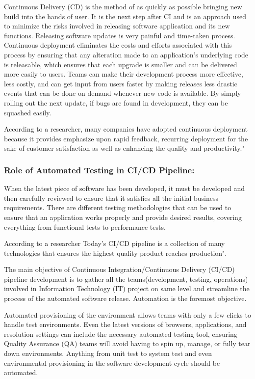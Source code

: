 Continuous Delivery (CD) is the method of as quickly as possible bringing new build into
the hands of user. It is the next step after CI and is an approach used to minimize the
risks involved in releasing software application and its new functions. Releasing software
updates is very painful and time-taken process. Continuous deployment eliminates the
costs and efforts associated with this process by ensuring that any alteration made to an
application's underlying code is releasable, which ensures that each upgrade is smaller and
can be delivered more easily to users. Teams can make their development process more
effective, less costly, and can get input from users faster by making releases less drastic
events that can be done on demand whenever new code is available. By simply rolling
out the next update, if bugs are found in development, they can be squashed easily. \par


According to a researcher, many companies have adopted continuous deployment because
it provides emphasize upon rapid feedback, recurring deployment for the sake of customer
satisfaction as well as enhancing the quality and productivity." \cite{c12c3fdcbeb64c018fb3b6dadcd2c936} 

\subsubsection{Role of Automated Testing in CI/CD Pipeline:}


When the latest piece of software has been developed, it must be developed and then
carefully reviewed to ensure that it satisfies all the initial business requirements. There
are different testing methodologies that can be used to ensure that an application works
properly and provide desired results, covering everything from functional tests to performance
tests. \par

According to a researcher Today's CI/CD pipeline is a collection of many technologies
that ensures the highest quality product reaches production". \cite{wolf2016automated} \par

The main objective of Continuous Integration/Continuous Delivery (CI/CD) pipeline
development is to gather all the teams(development, testing, operations) involved in
Information Technology (IT) project on same level and streamline the process of the
automated software release. Automation is the foremost objective. \par


Automated provisioning of the environment allows teams with only a few clicks to handle
test environments. Even the latest versions of browsers, applications, and resolution
settings can include the necessary automated testing tool, ensuring Quality Assurance
(QA) teams will avoid having to spin up, manage, or fully tear down environments.
Anything from unit test to system test and even environmental provisioning in the software
development cycle should be automated. 

